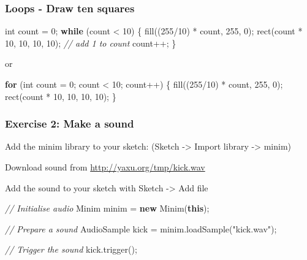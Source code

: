\documentclass[ignorenonframetext,]{beamer}
\newenvironment{Shaded}{}{}
\newcommand{\KeywordTok}[1]{\textcolor[rgb]{0.00,0.44,0.13}{\textbf{{#1}}}}
\newcommand{\DataTypeTok}[1]{\textcolor[rgb]{0.56,0.13,0.00}{{#1}}}
\newcommand{\DecValTok}[1]{\textcolor[rgb]{0.25,0.63,0.44}{{#1}}}
\newcommand{\StringTok}[1]{\textcolor[rgb]{0.25,0.44,0.63}{{#1}}}
\newcommand{\CommentTok}[1]{\textcolor[rgb]{0.38,0.63,0.69}{\textit{{#1}}}}
\newcommand{\FunctionTok}[1]{\textcolor[rgb]{0.02,0.16,0.49}{{#1}}}
\newcommand{\NormalTok}[1]{{#1}}
\begin{document}
\begin{frame}[fragile]\frametitle{Loops - Draw ten squares}

\begin{Shaded}
\begin{Highlighting}[]
\DataTypeTok{int} \NormalTok{count = }\DecValTok{0}\NormalTok{;}
\KeywordTok{while} \NormalTok{(count < }\DecValTok{10}\NormalTok{) \{}
  \FunctionTok{fill}\NormalTok{((}\DecValTok{255}\NormalTok{/}\DecValTok{10}\NormalTok{) * count, }\DecValTok{255}\NormalTok{, }\DecValTok{0}\NormalTok{);}
  \FunctionTok{rect}\NormalTok{(count * }\DecValTok{10}\NormalTok{, }\DecValTok{10}\NormalTok{, }\DecValTok{10}\NormalTok{, }\DecValTok{10}\NormalTok{);}
  \CommentTok{// add 1 to count}
  \NormalTok{count++;}
\NormalTok{\} }
\end{Highlighting}
\end{Shaded}

or

\begin{Shaded}
\begin{Highlighting}[]
\KeywordTok{for} \NormalTok{(}\DataTypeTok{int} \NormalTok{count = }\DecValTok{0}\NormalTok{; count < }\DecValTok{10}\NormalTok{; count++) \{}
  \FunctionTok{fill}\NormalTok{((}\DecValTok{255}\NormalTok{/}\DecValTok{10}\NormalTok{) * count, }\DecValTok{255}\NormalTok{, }\DecValTok{0}\NormalTok{);}
  \FunctionTok{rect}\NormalTok{(count * }\DecValTok{10}\NormalTok{, }\DecValTok{10}\NormalTok{, }\DecValTok{10}\NormalTok{, }\DecValTok{10}\NormalTok{);}
\NormalTok{\} }
\end{Highlighting}
\end{Shaded}

\end{frame}

\begin{frame}[fragile]\frametitle{Exercise 2: Make a sound}

Add the minim library to your sketch: (Sketch -\textgreater{} Import
library -\textgreater{} minim)

Download sound from \url{http://yaxu.org/tmp/kick.wav}

Add the sound to your sketch with Sketch -\textgreater{} Add file

\begin{Shaded}
\begin{Highlighting}[]
\CommentTok{// Initialise audio}
\NormalTok{Minim minim = }\KeywordTok{new} \FunctionTok{Minim}\NormalTok{(}\KeywordTok{this}\NormalTok{);}

\CommentTok{// Prepare a sound}
\NormalTok{AudioSample kick = minim.}\FunctionTok{loadSample}\NormalTok{(}\StringTok{"kick.wav"}\NormalTok{);}

\CommentTok{// Trigger the sound}
\NormalTok{kick.}\FunctionTok{trigger}\NormalTok{();}
\end{Highlighting}
\end{Shaded}

\end{frame}
\end{document}
